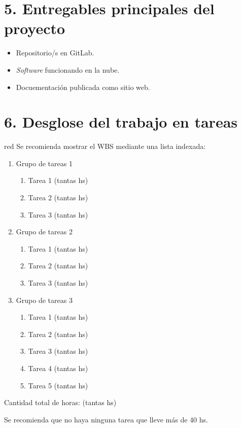 \documentclass[11pt]{charter}
\begin{document}
\section{5. Entregables principales del proyecto}
\label{sec:entregables}

\begin{itemize}
\item Repositorio/s en GitLab.
\item \textit{Software} funcionando en la nube.
\item Docuementación publicada como sitio web.
\end{itemize}

\section{6. Desglose del trabajo en tareas}
\label{sec:wbs}

\begin{consigna}{red}
Se recomienda mostrar el WBS mediante una lista indexada:

\begin{enumerate}
\item Grupo de tareas 1
	\begin{enumerate}
	\item Tarea 1 (tantas hs)
	\item Tarea 2 (tantas hs)
	\item Tarea 3 (tantas hs)
	\end{enumerate}
\item Grupo de tareas 2
	\begin{enumerate}
	\item Tarea 1 (tantas hs)
	\item Tarea 2 (tantas hs)
	\item Tarea 3 (tantas hs)
	\end{enumerate}
	\item Grupo de tareas 3
	\begin{enumerate}
	\item Tarea 1 (tantas hs)
	\item Tarea 2 (tantas hs)
	\item Tarea 3 (tantas hs)
	\item Tarea 4 (tantas hs)
	\item Tarea 5 (tantas hs)
	\end{enumerate}
\end{enumerate}

Cantidad total de horas: (tantas hs)

Se recomienda que no haya ninguna tarea que lleve más de 40 hs. 

\end{consigna}
\end{document}
